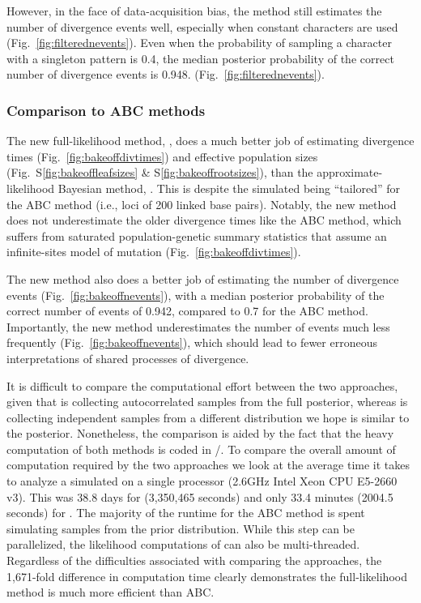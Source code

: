 \ifembed{

}{}

However, in the face of data-acquisition bias, the method still estimates the
number of divergence events well, especially when constant characters are used
(Fig.~\ref{fig:filterednevents}).
Even when the probability of sampling a character with a singleton pattern is
0.4, the median posterior probability of the correct number of divergence
events is 0.948.
(Fig.~\ref{fig:filterednevents}).

\ifembed{

}{}

\subsubsection{Comparison to ABC methods}

The new full-likelihood method, \ecoevolity, does a much better job of
estimating divergence times
(Fig.~\ref{fig:bakeoffdivtimes})
and effective population sizes
(Fig.\ 
S\ref{fig:bakeoffleafsizes}
\&
S\ref{fig:bakeoffrootsizes}),
than the approximate-likelihood Bayesian method, \dppmsbayes.
This is despite the simulated \datasets being ``tailored'' for the ABC method
(i.e., loci of 200 linked base pairs).
Notably, the new method does not underestimate the older divergence times like
the ABC method, which suffers from saturated population-genetic summary
statistics that assume an infinite-sites model of mutation
(Fig.~\ref{fig:bakeoffdivtimes}).

\ifembed{

}{}

The new method also does a better job of estimating the number of divergence
events (Fig.~\ref{fig:bakeoffnevents}), with a median posterior probability
of the correct number of events of 0.942, compared to 0.7 for the ABC method.
Importantly, the new method underestimates the number of events much less
frequently (Fig.~\ref{fig:bakeoffnevents}),
which should lead to fewer erroneous interpretations of shared processes of
divergence.

\ifembed{

}{}

It is difficult to compare the computational effort between the two approaches,
given that \ecoevolity is collecting autocorrelated samples from
the full posterior, whereas \dppmsbayes is collecting independent samples
from a different distribution we hope is similar to the posterior.
Nonetheless, the comparison is aided by the fact that the heavy computation of
both methods is coded in \clang/\cpp.
To compare the overall amount of computation required by the two approaches
we look at the average time it takes to analyze a simulated \dataset
on a single processor 
(2.6GHz Intel Xeon CPU E5-2660 v3).
This was 38.8 days for \dppmsbayes (3,350,465 seconds)
and only 33.4 minutes (2004.5 seconds) for \ecoevolity.
The majority of the runtime for the ABC method is spent simulating samples
from the prior distribution.
While this step can be parallelized, the likelihood computations of \ecoevolity
can also be multi-threaded.
Regardless of the difficulties associated with comparing the approaches, the
1,671-fold difference in computation time clearly demonstrates the
full-likelihood method is much more efficient than ABC.


